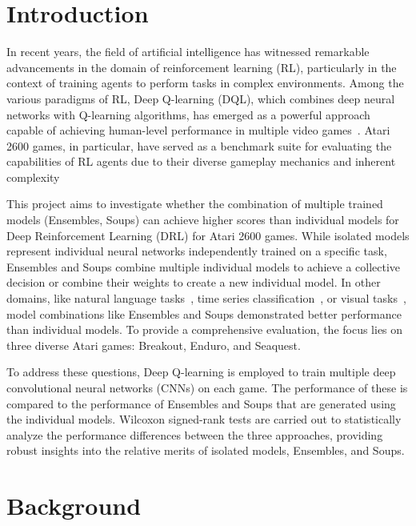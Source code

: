 \chapter{Introduction}

In recent years, the field of artificial intelligence has witnessed remarkable advancements in the domain of reinforcement learning (RL), particularly in the context of training agents to perform tasks in complex environments. Among the various paradigms of RL, Deep Q-learning  (DQL), which combines deep neural networks with Q-learning algorithms, has emerged as a powerful approach capable of achieving human-level performance in multiple video games~\parencite{mnih_human-level_2015,arulkumaran_deep_2017,shao_survey_2019}. Atari 2600 games, in particular, have served as a benchmark suite for evaluating the capabilities of RL agents due to their diverse gameplay mechanics and inherent complexity~\parencite{mnih_playing_2013,mnih_human-level_2015,van_hasselt_deep_2015}

This project aims to investigate whether the combination of multiple trained models (Ensembles, Soups) can achieve higher scores than individual models for Deep Reinforcement Learning (DRL) for Atari 2600 games. While isolated models represent individual neural networks independently trained on a specific task, Ensembles and Soups combine multiple individual models to achieve a collective decision or combine their weights to create a new individual model. In other domains, like natural language tasks~\parencite{wortsman_model_2022,kanakaraj_performance_2015}, time series classification~\parencite{ismail_fawaz_deep_2019}, or visual tasks~\parencite{wen_ensemble_2017,goyal_deep_2018,maron_model_2022,dansereau_model_2023}, model combinations like Ensembles and Soups demonstrated better performance than individual models. To provide a comprehensive evaluation, the focus lies on three diverse Atari games: Breakout, Enduro, and Seaquest.

To address these questions, Deep Q-learning is employed to train multiple deep convolutional neural networks (CNNs) on each game. The performance of these is compared to the performance of Ensembles and Soups that are generated using the individual models. Wilcoxon signed-rank tests are carried out to statistically analyze the performance differences between the three approaches, providing robust insights into the relative merits of isolated models, Ensembles, and Soups.


\chapter{Background}

